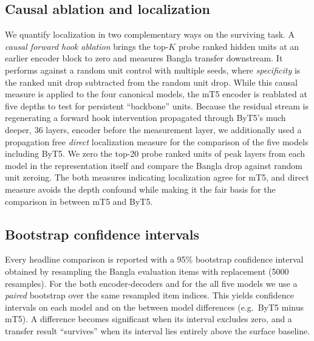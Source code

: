 \documentclass[preprint,12pt]{elsarticle}
\begin{document}
\subsection{Causal ablation and localization}
We quantify localization in two complementary ways on the surviving task. A \emph{causal forward hook ablation} brings the top-$K$ probe ranked hidden units at an earlier encoder block to zero and measures Bangla transfer downstream. It performs against a random unit control with multiple seeds, where \emph{specificity} is the ranked unit drop subtracted from the random unit drop. While this causal measure is applied to the four canonical models, the mT5 encoder is reablated at five depths to test for persistent ``backbone'' units. Because the residual stream is regenerating a forward hook intervention propagated through ByT5's much deeper, 36 layers, encoder before the measurement layer, we additionally used a propagation free \emph{direct} localization measure for the comparison of the five models including ByT5. We zero the top-20 probe ranked units of peak layers from each model in the representation itself and compare the Bangla drop against random unit zeroing. The both measures indicating localization agree for mT5, and direct measure avoids the depth confound while making it the fair basis for the comparison in between mT5 and ByT5.

\subsection{Bootstrap confidence intervals}
Every headline comparison is reported with a 95\% bootstrap confidence interval \cite{efron1994bootstrap} obtained by resampling the Bangla evaluation items with replacement (5000 resamples). For the both encoder-decoders and for the all five models we use a \emph{paired} bootstrap over the same resampled item indices. This yields confidence intervals on each model and on the between model differences (e.g.\ ByT5 minus mT5). A difference becomes significant when its interval excludes zero, and a transfer result ``survives'' when its interval lies entirely above the surface baseline.
\end{document}
